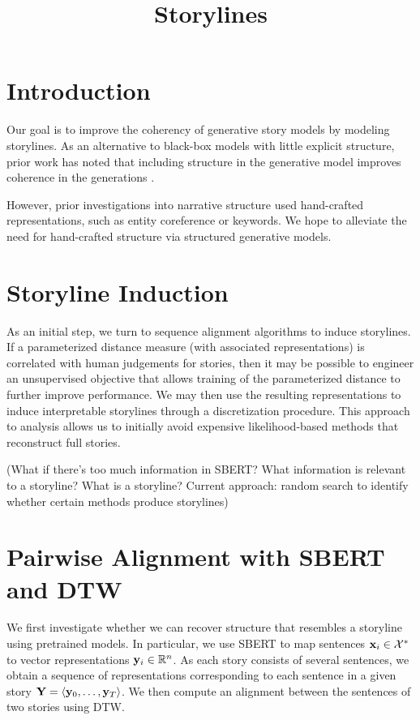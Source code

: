 \documentclass{article}
\title{Storylines}
\begin{document}
\maketitle

\section{Introduction}
Our goal is to improve the coherency of generative story models by modeling storylines.
As an alternative to black-box models with little explicit structure,
prior work has noted that including structure in the generative model improves coherence
in the generations \citep{yao2018storyline,fan2019structure}.

However, prior investigations into narrative structure used hand-crafted representations,
such as entity coreference or keywords.
We hope to alleviate the need for hand-crafted structure via structured generative models.

\section{Storyline Induction}
As an initial step, we turn to sequence alignment algorithms to induce storylines.
If a parameterized distance measure (with associated representations)
is correlated with human judgements for stories,
then it may be possible to engineer an unsupervised objective that allows
training of the parameterized distance to further improve performance.
We may then use the resulting representations to induce interpretable storylines
through a discretization procedure.
This approach to analysis allows us to initially avoid expensive
likelihood-based methods that reconstruct full stories.

(What if there's too much information in SBERT?
What information is relevant to a storyline?
What is a storyline?
Current approach: random search to identify whether certain methods
produce storylines)

\section{Pairwise Alignment with SBERT and DTW}
\label{pairwise}
We first investigate whether we can recover structure that resembles a storyline
using pretrained models.
In particular, we use SBERT \citep{reimers2019sbert}
to map sentences $\mathbf{x}_i \in \mathcal{X}^*$ to vector representations $\mathbf{y}_i \in \mathbb{R}^n$.
As each story consists of several sentences, we obtain a sequence of representations
corresponding to each sentence in a given story $\mathbf{Y} = \langle \mathbf{y}_0, \ldots, \mathbf{y}_T \rangle$.
We then compute an alignment between the sentences of two stories using DTW.
\end{document}
